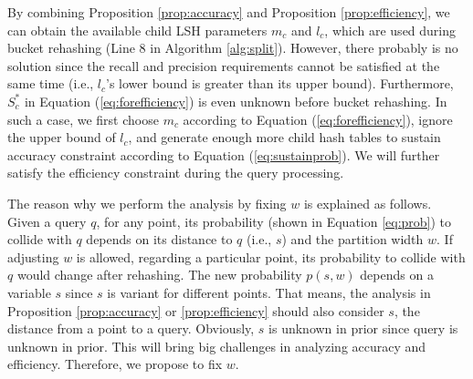 
By combining Proposition \ref{prop:accuracy} and Proposition \ref{prop:efficiency}, we can obtain the available child LSH parameters $m_c$ and $l_c$, which are used during bucket rehashing (Line 8 in Algorithm \ref{alg:split}). However, there probably is no solution since the recall and precision requirements cannot be satisfied at the same time (i.e., $l_c$'s lower bound is greater than its upper bound). Furthermore, $S_c^*$ in Equation (\ref{eq:forefficiency}) is even unknown before bucket rehashing. In such a case, we first choose $m_c$ according to Equation (\ref{eq:forefficiency}), ignore the upper bound of $l_c$, and generate enough more child hash tables to sustain accuracy constraint according to Equation (\ref{eq:sustainprob}). We will further satisfy the efficiency constraint during the query processing.

The reason why we perform the analysis by fixing $w$ is explained as follows. Given a query $q$, for any point, its probability (shown in Equation \ref{eq:prob}) to collide with $q$ depends on its distance to $q$ (i.e., $s$) and the partition width $w$. If adjusting $w$ is allowed, regarding a particular point, its probability to collide with $q$ would change after rehashing. The new probability $p(s, w)$ depends on a variable $s$ since $s$ is variant for different points. That means, the analysis in Proposition \ref{prop:accuracy} or \ref{prop:efficiency} should also consider $s$, the distance from a point to a query. Obviously, $s$ is unknown in prior since query is unknown in prior. This will bring big challenges in analyzing accuracy and efficiency. Therefore, we propose to fix $w$.



